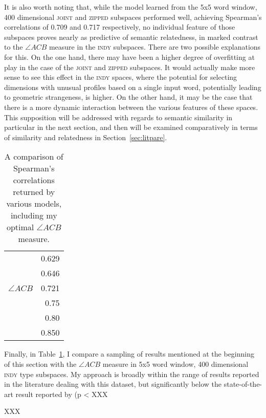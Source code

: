 It is also worth noting that, while the model learned from the 5x5 word window, 400 dimensional \textsc{joint} and \textsc{zipped} subspaces performed well, achieving Spearman's correlations of 0.709 and 0.717 respectively, no individual feature of those subspaces proves nearly as predictive of semantic relatedness, in marked contrast to the $\angle ACB$ measure in the \textsc{indy} subspaces.  There are two possible explanations for this.  On the one hand, there may have been a higher degree of overfitting at play in the case of the \textsc{joint} and \textsc{zipped} subspaces.  It would actually make more sense to see this effect in the \textsc{indy} spaces, where the potential for selecting dimensions with unusual profiles based on a single input word, potentially leading to geometric strangeness, is higher.  On the other hand, it may be the case that there is a more dynamic interaction between the various features of these spaces.  This supposition will be addressed with regards to semantic similarity in particular in the next section, and then will be examined comparatively in terms of similarity and relatedness in Section~\ref{sec:litpare}.

\begin{table}
\centering
\begin{tabular}{lr}
\hline
\cite{HassanEA2011} & 0.629 \\
\cite{LuongEA2013} & 0.646 \\
$\angle ACB$ & 0.721 \\
\cite{GabrilovichEA2007} & 0.75 \\
\cite{RadinskyEA2011} & 0.80 \\
\cite{HalawiEA2012} & 0.850 \\
\hline
\end{tabular}
\caption{A comparison of Spearman's correlations returned by various models, including my optimal $\angle ACB$ measure.}
\label{tab:relpare}
\end{table}

Finally, in Table~\ref{tab:relpare}, I compare a sampling of results mentioned at the beginning of this section with the $\angle ACB$ measure in 5x5 word window, 400 dimensional \textsc{indy} type subspaces.  My approach is broadly within the range of results reported in the literature dealing with this dataset, but significantly below the state-of-the-art result reported by \cite{HalawieEA2012} (p < XXX

XXX


